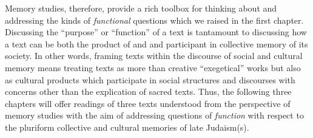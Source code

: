 Memory studies, therefore, provide a rich toolbox for thinking about and addressing the kinds of \emph{functional} questions which we raised in the first chapter. Discussing the ``purpose'' or ``function'' of a text is tantamount to discussing how a text can be both the product of and and participant in collective memory of its society. In other words, framing \rwb texts within the discourse of social and cultural memory means treating \rwb texts as more than creative ``exegetical'' works but also as cultural products which participate in social structures and discourses with concerns other than the explication of sacred texts. Thus, the following three chapters will offer readings of three \rwb texts understood from the perspective of memory studies with the aim of addressing questions of \emph{function} with respect to the pluriform collective and cultural memories of late \secondtemple Judaism(s).